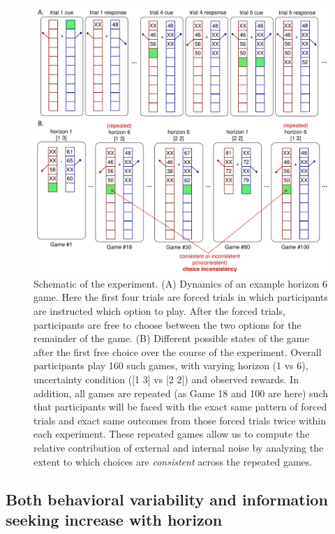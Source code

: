 \documentclass[12pt]{article}
\begin{document}
	\begin{figure}[hp]
		\begin{center}
			\includegraphics[width=\textwidth]{figures/taskfiga.pdf}
			\caption{
			Schematic of the experiment. (A) Dynamics of an example horizon 6 game.  Here the first four trials are forced trials in which participants are instructed which option to play.  After the forced trials, participants are free to choose between the two options for the remainder of the game.  (B) Different possible states of the game after the first free choice over the course of the experiment. Overall participants play 160 such games, with varying horizon (1 vs 6), uncertainty condition ([1 3] vs [2 2]) and observed rewards.  In addition, all games are repeated (as Game 18 and 100 are here) such that participants will be faced with the exact same pattern of forced trials and exact same outcomes from those forced trials twice within each experiment.  These repeated games allow us to compute the relative contribution of external and internal noise by analyzing the extent to which choices are {\em consistent} across the repeated games.}%
			\label{fig:taskfig}
		\end{center}
	\end{figure}
	
	\subsection*{Both behavioral variability and information seeking increase with horizon}
	
\end{document}
